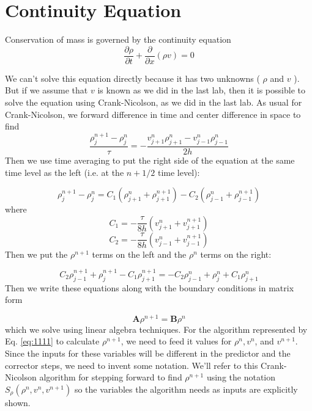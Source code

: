 \section*{Continuity Equation}
Conservation of mass is governed by the continuity equation
\begin{equation}\label{eq:1105}
\frac{\partial \rho}{\partial t}+\frac{\partial}{\partial x}(\rho v)=0
\end{equation}

We can\rq t solve this equation directly because it has two unknowns ( $\rho$ and $v$ ). But if we assume that $v$ is known as we did in the last lab, then it is possible to solve the equation using Crank-Nicolson, as we did in the last lab. As usual for Crank-Nicolson, we forward difference in time and center difference in space to find
\begin{equation}\label{eq:1106}
\frac{\rho_{j}^{n+1}-\rho_{j}^{n}}{\tau}=-\frac{v_{j+1}^{n} \rho_{j+1}^{n}-v_{j-1}^{n} \rho_{j-1}^{n}}{2 h}
\end{equation}
Then we use time averaging to put the right side of the equation at the same time level as the left (i.e. at the $n+1 / 2$ time level):

\begin{equation}\label{eq:1107}
\rho_{j}^{n+1}-\rho_{j}^{n}=C_{1}\left(\rho_{j+1}^{n}+\rho_{j+1}^{n+1}\right)-C_{2}\left(\rho_{j-1}^{n}+\rho_{j-1}^{n+1}\right)
\end{equation}
where
\begin{equation}\label{eq:1108}
C_{1}=-\frac{\tau}{8 h}\left(v_{j+1}^{n}+v_{j+1}^{n+1}\right)
\end{equation}
\begin{equation}\label{eq:1109}
C_{2}=-\frac{\tau}{8 h}\left(v_{j-1}^{n}+v_{j-1}^{n+1}\right)
\end{equation}
 Then we put the  $\rho^{n+1}$  terms on the left and the $\rho^{n}$ terms on the right: 

\begin{equation}\label{eq:1110}
C_{2} \rho_{j-1}^{n+1}+\rho_{j}^{n+1}-C_{1} \rho_{j+1}^{n+1}=-C_{2} \rho_{j-1}^{n}+\rho_{j}^{n}+C_{1} \rho_{j+1}^{n}
\end{equation}
Then we write these equations along with the boundary conditions in matrix form

\begin{equation}\label{eq:1111}
\mathbf{A} \rho^{n+1}=\mathbf{B} \rho^{n}
\end{equation}
which we solve using linear algebra techniques. For the algorithm represented by Eq. \eqref{eq:1111} to calculate $\rho^{n+1}$, we need to feed it values for $\rho^{n}, v^{n}$, and $v^{n+1}$. Since the inputs for these variables will be different in the predictor and the corrector steps, we need to invent some notation. We\rq ll refer to this Crank-Nicolson algorithm for stepping forward to find $\rho^{n+1}$ using the notation $S_{\rho}\left(\rho^{n}, v^{n}, v^{n+1}\right)$ so the variables the algorithm needs as inputs are explicitly shown.

